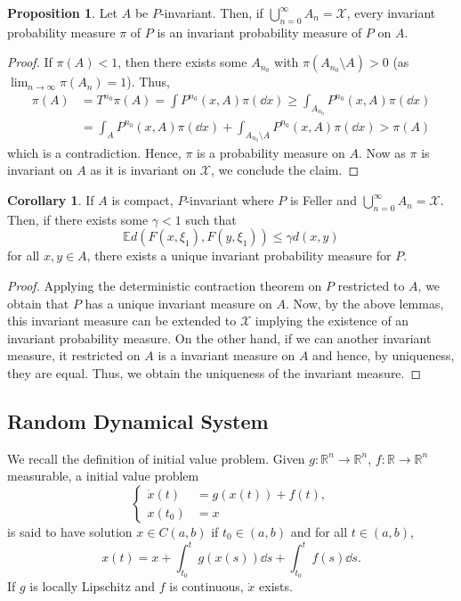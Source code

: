 \documentclass[]{article}
\theoremstyle{definition}
\newtheorem{corollary}{Corollary}[theorem]
\theoremstyle{definition}
\newtheorem{proposition}{Proposition}[section]
\begin{document}
\begin{proposition}
  Let \(A\) be \(P\)-invariant. Then, if \(\bigcup_{n = 0}^\infty A_n = \mathcal{X}\),
  every invariant probability measure \(\pi\) of \(P\) is an invariant probability 
  measure of \(P\) on \(A\). 
\end{proposition}
\begin{proof}
  If \(\pi(A) < 1\), then there exists some \(A_{n_0}\) with 
  \(\pi(A_{n_0} \setminus A) > 0\) (as \(\lim_{n \to \infty} \pi(A_n) = 1\)).
  Thus, 
  \[\begin{split}
    \pi(A) & = T^{n_0}\pi(A) = \int P^{n_0}(x, A) \pi(\dd x) 
      \ge \int_{A_{n_0}} P^{n_0}(x, A) \pi(\dd x) \\
    & = \int_A P^{n_0}(x, A) \pi(\dd x) + \int_{A_{n_0} \setminus A}
      P^{n_0}(x, A) \pi(\dd x) > \pi(A)
  \end{split}\]
  which is a contradiction. Hence, \(\pi\) is a probability measure on \(A\). 
  Now as \(\pi\) is invariant on \(A\) as it is invariant on \(\mathcal{X}\), 
  we conclude the claim.
\end{proof}

\begin{corollary}
  If \(A\) is compact, \(P\)-invariant where \(P\) is Feller and 
  \(\bigcup_{n = 0}^\infty A_n = \mathcal{X}\). Then, if there exists some 
  \(\gamma < 1\) such that 
  \[\mathbb{E}d(F(x, \xi_1), F(y, \xi_1)) \le \gamma d(x, y)\]
  for all \(x, y \in A\), there exists a unique invariant probability measure 
  for \(P\).
\end{corollary}
\begin{proof}
  Applying the deterministic contraction theorem on \(P\) restricted to \(A\), 
  we obtain that \(P\) has a unique invariant measure on \(A\). Now, by the 
  above lemmas, this invariant measure can be extended to \(\mathcal{X}\) 
  implying the existence of an invariant probability measure. On the other 
  hand, if we can another invariant measure, it restricted on \(A\) is a 
  invariant measure on \(A\) and hence, by uniqueness, they are equal. 
  Thus, we obtain the uniqueness of the invariant measure.
\end{proof}

\subsection{Random Dynamical System}

We recall the definition of initial value problem. Given 
\(g : \mathbb{R}^n \to \mathbb{R}^n\), \(f : \mathbb{R} \to \mathbb{R}^n\) 
measurable, a initial value problem 
\[\begin{cases}
  \dot x(t) & = g(x(t)) + f(t),\\
  x(t_0) & = x
\end{cases}\]
is said to have solution \(x \in C(a, b)\) if \(t_0 \in (a, b)\) and 
for all \(t \in (a, b)\), 
\[x(t) = x + \int_{t_0}^t g(x(s)) \dd s + \int_{t_0}^t f(s) \dd s.\]
If \(g\) is locally Lipschitz and \(f\) is continuous, \(\dot x\) exists.
\end{document}
